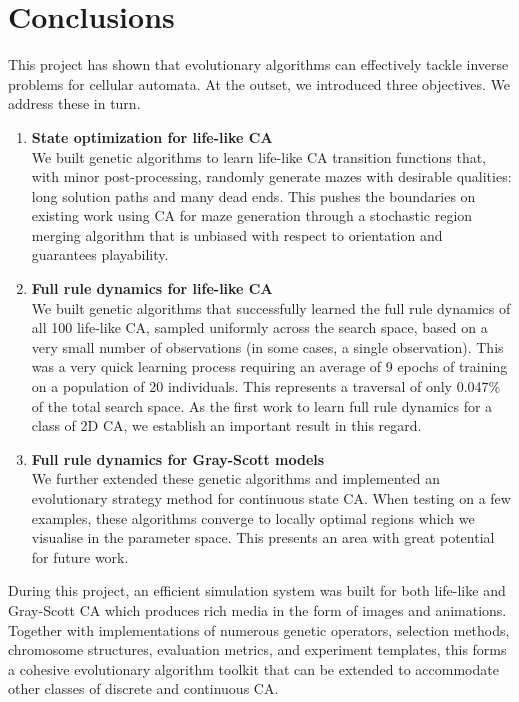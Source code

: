 \chapter{Conclusions}

This project has shown that evolutionary algorithms can effectively tackle inverse problems for cellular automata. At the outset, we introduced three objectives. We address these in turn.
\begin{enumerate}
    \item \textbf{State optimization for life-like CA}\\
    We built genetic algorithms to learn life-like CA transition functions that, with minor post-processing, randomly generate mazes with desirable qualities: long solution paths and many dead ends. This pushes the boundaries on existing work using CA for maze generation\cite{adams2017procedural, adams2018evolving} through a stochastic region merging algorithm that is unbiased with respect to orientation and guarantees playability.
    \item \textbf{Full rule dynamics for life-like CA}\\
    We built genetic algorithms that successfully learned the full rule dynamics of all 100 life-like CA, sampled uniformly across the search space, based on a very small number of observations (in some cases, a single observation). This was a very quick learning process requiring an average of 9 epochs of training on a population of 20 individuals. This represents a traversal of only 0.047\% of the total search space. As the first work to learn full rule dynamics for a class of 2D CA, we establish an important result in this regard.
    \item \textbf{Full rule dynamics for Gray-Scott models}\\
    We further extended these genetic algorithms and implemented an evolutionary strategy method for continuous state CA. When testing on a few examples, these algorithms converge to locally optimal regions which we visualise in the parameter space. This presents an area with great potential for future work.
\end{enumerate}

During this project, an efficient simulation system was built for both life-like and Gray-Scott CA which produces rich media in the form of images and animations. Together with implementations of numerous genetic operators, selection methods, chromosome structures, evaluation metrics, and experiment templates, this forms a cohesive evolutionary algorithm toolkit that can be extended to accommodate other classes of discrete and continuous CA.

